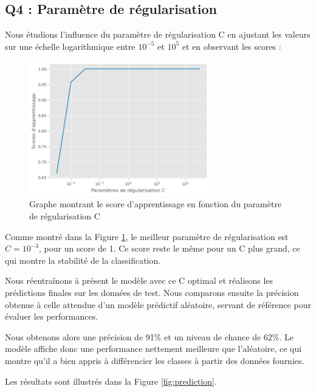 \documentclass{scrartcl}
\begin{document}
\subsection{Q4 : Paramètre de régularisation}

\hspace{7pt} Nous étudions l'influence du paramètre de régularisation C en ajustant les valeurs sur une échelle logarithmique entre $10^{-5}$ et $10^5$ et en observant les scores :

\begin{figure}[h!]
    \centering
    \includegraphics[width=0.7\textwidth]{../images/classification.png}
    \caption{\centering Graphe montrant le score d'apprentissage en fonction du paramètre de régularisation C} 
    \label{fig:score}
\end{figure}

Comme montré dans la Figure \ref{fig:score}, le meilleur paramètre de régularisation est $C = 10^{-3}$, pour un score de 1. Ce score reste le même pour un C plus grand, ce qui montre la stabilité de la classification.\newline

Nous réentraînons à présent le modèle avec ce C optimal et réalisons les prédictions finales sur les données de test. Nous comparons ensuite la précision obtenue à celle attendue d'un modèle prédictif aléatoire, servant de référence pour évaluer les performances.\newline

Nous obtenons alors une précision de 91\% et un niveau de chance de 62\%. Le modèle affiche donc une performance nettement meilleure que l'aléatoire, ce qui montre qu'il a bien appris à différencier les classes à partir des données fournies.\newline

Les résultats sont illustrés dans la Figure \ref{fig:prediction}.
\end{document}
